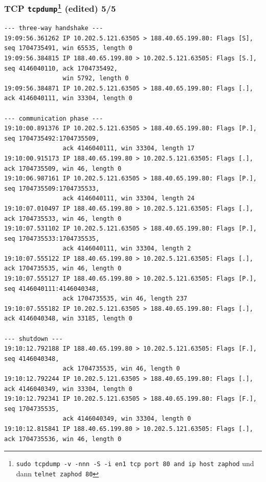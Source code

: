 \documentclass[ignorenonframetext]{beamer}
\begin{document}
\begin{frame}[fragile]
\frametitle{TCP \texttt{tcpdump}{}\footnote{\texttt{sudo tcpdump -v -nnn -S -i en1 tcp port 80 and ip host zaphod} und dann \texttt{telnet zaphod 80}} (edited) 5/5}
\begin{tiny}
\begin{verbatim}
--- three-way handshake ---
19:09:56.361262 IP 10.202.5.121.63505 > 188.40.65.199.80: Flags [S], seq 1704735491, win 65535, length 0
19:09:56.384815 IP 188.40.65.199.80 > 10.202.5.121.63505: Flags [S.], seq 4146040110, ack 1704735492,
                win 5792, length 0
19:09:56.384871 IP 10.202.5.121.63505 > 188.40.65.199.80: Flags [.], ack 4146040111, win 33304, length 0

--- communication phase ---
19:10:00.891376 IP 10.202.5.121.63505 > 188.40.65.199.80: Flags [P.], seq 1704735492:1704735509,
                ack 4146040111, win 33304, length 17
19:10:00.915173 IP 188.40.65.199.80 > 10.202.5.121.63505: Flags [.], ack 1704735509, win 46, length 0
19:10:06.987161 IP 10.202.5.121.63505 > 188.40.65.199.80: Flags [P.], seq 1704735509:1704735533,
                ack 4146040111, win 33304, length 24
19:10:07.010497 IP 188.40.65.199.80 > 10.202.5.121.63505: Flags [.], ack 1704735533, win 46, length 0
19:10:07.531102 IP 10.202.5.121.63505 > 188.40.65.199.80: Flags [P.], seq 1704735533:1704735535,
                ack 4146040111, win 33304, length 2
19:10:07.555122 IP 188.40.65.199.80 > 10.202.5.121.63505: Flags [.], ack 1704735535, win 46, length 0
19:10:07.555127 IP 188.40.65.199.80 > 10.202.5.121.63505: Flags [P.], seq 4146040111:4146040348,
                ack 1704735535, win 46, length 237
19:10:07.555182 IP 10.202.5.121.63505 > 188.40.65.199.80: Flags [.], ack 4146040348, win 33185, length 0

--- shutdown ---
19:10:12.792188 IP 188.40.65.199.80 > 10.202.5.121.63505: Flags [F.], seq 4146040348,
                ack 1704735535, win 46, length 0
19:10:12.792244 IP 10.202.5.121.63505 > 188.40.65.199.80: Flags [.], ack 4146040349, win 33304, length 0
19:10:12.792341 IP 10.202.5.121.63505 > 188.40.65.199.80: Flags [F.], seq 1704735535,
                ack 4146040349, win 33304, length 0
19:10:12.815841 IP 188.40.65.199.80 > 10.202.5.121.63505: Flags [.], ack 1704735536, win 46, length 0
\end{verbatim}
\end{tiny}
\end{frame}
\end{document}
